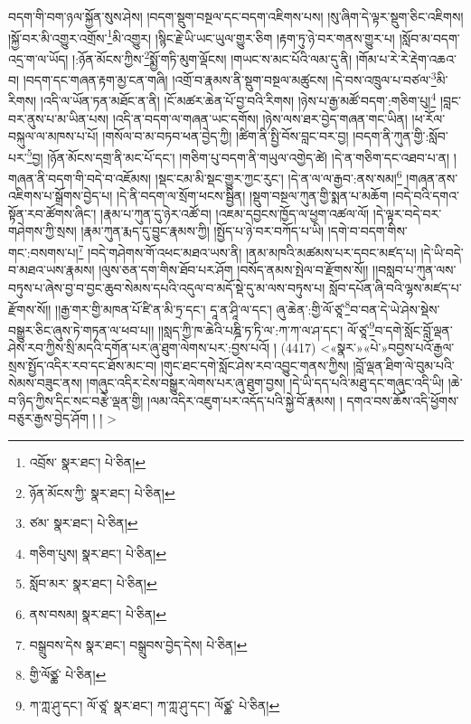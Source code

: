 བདག་གི་བག་ཉལ་སྐྱོན་སུས་ཤེས། །བདག་སྡུག་བསྔལ་དང་བདག་འཇིགས་པས། །སུ་ཞིག་དེ་ལྟར་སྡུག་ཅིང་འཇིགས། །སྐྱོ་བར་མི་འགྱུར་འགྲོས་\footnote{འབྲོས་  སྣར་ཐང་།  པེ་ཅིན། }མི་འགྱུར། །སྙིང་རྗེ་ཡི་ཡང་ཡུལ་གྱུར་ཅིག །རྟག་ཏུ་ཉེ་བར་གནས་གྱུར་པ། །སློབ་མ་བདག་འདྲ་ག་ལ་ཡོད། །:ཉོན་མོངས་ཀྱིས་\footnote{ཉོན་མོངས་ཀྱི་  སྣར་ཐང་།  པེ་ཅིན། }སྨྱོ་གཏི་མུག་ལྡོངས། །གཡང་ས་མང་པོའི་ལམ་དུ་ནི། །གོམ་པ་རེ་རེ་རྡེག་འཆའ་བ། །བདག་དང་གཞན་རྟག་མྱ་ངན་གཞི། །འགྲོ་བ་རྣམས་ནི་སྡུག་བསྔལ་མཚུངས། །དེ་བས་འཁྲུལ་པ་བཙལ་\footnote{ཙམ་  སྣར་ཐང་།  པེ་ཅིན། }མི་རིགས། །འདི་ལ་ཡོན་ཏན་མཐོང་ན་ནི། །ངོ་མཚར་ཆེན་པོ་བྱ་བའི་རིགས། །ཉེས་པ་རྒྱ་མཚོ་བདག་:གཅིག་པུ།\footnote{གཅིག་པུས།  སྣར་ཐང་།  པེ་ཅིན། } །བླང་བར་ནུས་པ་མ་ཡིན་པས། །འདི་ན་བདག་ལ་གཞན་ཡང་དགོས། །ཉེས་ལས་ཐར་བྱེད་གཞན་གང་ཡིན། །ཕ་རོལ་བསྐུལ་ལ་མཁས་པ་པོ། །གསོལ་བ་མ་བཏབ་ཕན་བྱེད་ཀྱི། །ཚིག་ནི་སྤྱི་བོས་བླང་བར་བྱ། །བདག་ནི་ཀུན་གྱི་:སློབ་པར་\footnote{སློབ་མར་  སྣར་ཐང་།  པེ་ཅིན། }བྱ། །ཉོན་མོངས་དགྲ་ནི་མང་པོ་དང་། །གཅིག་པུ་བདག་ནི་གཡུལ་འགྱེད་ཚེ། །དེ་ན་གཅིག་དང་འཐབ་པ་ན། །གཞན་ནི་བདག་གི་བདེ་བ་འཇོམས། །སྡང་ངམ་མི་སྡང་གྱུར་ཀྱང་རུང་། །དེ་ན་ལ་ལ་རྒྱབ་:ནས་སམ།\footnote{ནས་བསམ།  སྣར་ཐང་།  པེ་ཅིན། } །གཞན་ནས་འཇིགས་པ་སྒྲོགས་བྱེད་པ། །དེ་ནི་བདག་ལ་སྲོག་ཕངས་སྦྱིན། །སྡུག་བསྔལ་ཀུན་གྱི་སྨན་པ་མཆོག །བདེ་བའི་དགའ་སྟོན་རབ་ཚོགས་ཞིང་། །རྣམ་པ་ཀུན་དུ་ཉེར་འཚོ་བ། །འཇམ་དབྱངས་ཁྱོད་ལ་ཕྱག་འཚལ་ལོ། །དེ་ལྟར་བདེ་བར་གཤེགས་ཀྱི་སྲས། །རྣམ་ཀུན་རྨད་དུ་བྱུང་རྣམས་ཀྱི། །སྤྱོད་པ་ཉེ་བར་བཀོད་པ་ཡི། །དགེ་བ་བདག་གིས་གང་:བསགས་པ།\footnote{བསྒྲུབས་དེས  སྣར་ཐང་། བསྒྲུབས་བྱེད་དེས།  པེ་ཅིན། } །བདེ་གཤེགས་གོ་འཕང་མཐའ་ཡས་ནི། །ནམ་མཁའི་མཚམས་པར་དབང་མཛད་པ། །དེ་ཡི་བདེ་བ་མཐའ་ཡས་རྣམས། །ལུས་ཅན་དག་གིས་ཐོབ་པར་ཤོག །བསོད་ནམས་སྤེལ་བ་རྫོགས་སོ།། །།བསླབ་པ་ཀུན་ལས་བཏུས་པ་ཞེས་བྱ་བ་བྱང་ཆུབ་སེམས་དཔའི་འདུལ་བ་མདོ་སྡེ་དུ་མ་ལས་བཏུས་པ། སློབ་དཔོན་ཞི་བའི་ལྷས་མཛད་པ་རྫོགས་སོ།། །།རྒྱ་གར་གྱི་མཁན་པོ་ཛི་ན་མི་ཏྲ་དང་། དཱ་ན་ཤཱི་ལ་དང་། ཞུ་ཆེན་:གྱི་ལོ་ཙཱ་\footnote{གྱི་ལོཙྪ་  པེ་ཅིན། }བ་བན་དེ་ཡེ་ཤེས་སྡེས་བསྒྱུར་ཅིང་ཞུས་ཏེ་གཏན་ལ་ཕབ་པ།། །།སླད་ཀྱི་ཁ་ཆེའི་པཎྜི་ཏ་ཏི་ལ་:ཀ་ཀ་ལ་ཤ་དང་། ལོ་ཙཱ་\footnote{ཀ་ཀླ་ཤུ་དང་། ལོ་ཙཱ་  སྣར་ཐང་། ཀ་ཀླ་ཤུ་དང་། ལོཙྪ་  པེ་ཅིན། }བ་དགེ་སློང་བློ་ལྡན་ཤེས་རབ་ཀྱིས་སྲི་མདའི་དགོན་པར་ཞུ་ཐུག་ལེགས་པར་:བྱས་པའོ། ། (4417) <«སྣར་»«པེ་»བབྱས་པའོ་རྒྱལ་སྲས་སྤྱོད་འདིར་རབ་དང་ཐོས་མང་བ། །གུང་ཐང་དགེ་སློང་ཤེས་རབ་འབྱུང་གནས་ཀྱིས། །བློ་ལྡན་ཐིག་ལེ་བུམ་པའི་སེམས་བཟུང་ནས། །གཞུང་འདིར་ངེས་བསྒྱུར་ལེགས་པར་ཞུ་ཐུག་བྱས། །དེ་ཡི་དད་པའི་མཐུ་དང་གཞུང་འདི་ཡི། །ཆེ་བ་ཉིད་ཀྱིས་དིང་སང་བརྩེ་ལྡན་གྱི། །ལམ་འདིར་འཇུག་པར་འདོད་པའི་སྐྱེ་བོ་རྣམས། །
དགའ་བས་ཆོས་འདི་ཕྱོགས་བཅུར་རྒྱས་བྱེད་ཤོག ། ། >
